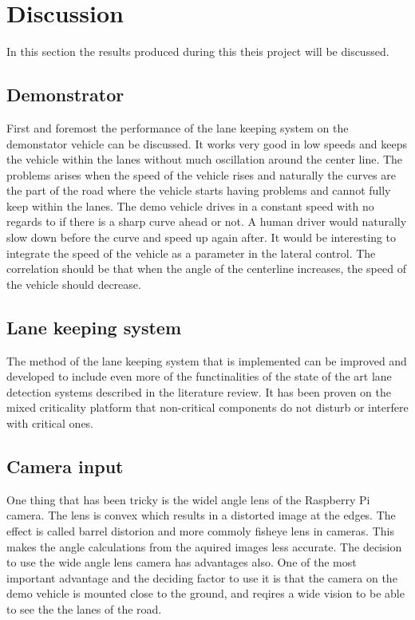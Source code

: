 \chapter{Discussion}
In this section the results produced during this theis project will be discussed.
\section{Demonstrator}
First and foremost the performance of the lane keeping system on the demonstator vehicle can be discussed. It works very good in low speeds and keeps the vehicle within the lanes without much oscillation around the center line. The problems arises when the speed of the vehicle rises and naturally the curves are the part of the road where the vehicle starts having problems and cannot fully keep within the lanes. The demo vehicle drives in a constant speed with no regards to if there is a sharp curve ahead or not. A human driver would naturally slow down before the curve and speed up again after. It would be interesting to integrate the speed of the vehicle as a parameter in the lateral control. The correlation should be that when the angle of the centerline increases, the speed of the vehicle should decrease. \\

\section{Lane keeping system}
The method of the lane keeping system that is implemented can be improved and developed to include even more of the functinalities of the state of the art lane detection systems described in the literature review. It has been proven \cite{zaki2016} on the mixed criticality platform that non-critical components do not disturb or interfere with critical ones.\\

\section{Camera input}
One thing that has been tricky is the widel angle lens of the Raspberry Pi camera. The lens is convex which results in a distorted image at the edges. The effect is called barrel distorion and more commoly fisheye lens in cameras. This makes the angle calculations from the aquired images less accurate. The decision to use the wide angle lens camera has advantages also. One of the most important advantage and the deciding factor to use it is that the camera on the demo vehicle is mounted close to the ground, and reqires a wide vision to be able to see the the lanes of the road.\\

